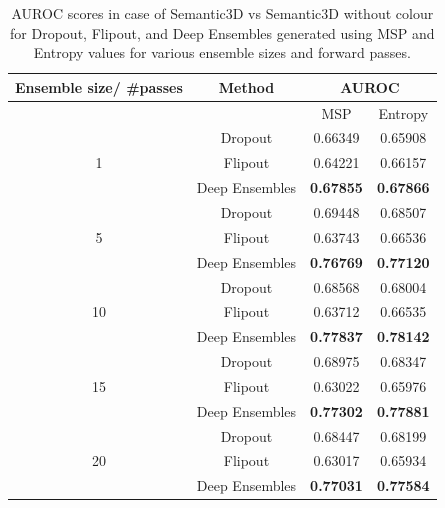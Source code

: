     \begin{table}[h!]
        \centering
        \begin{tabular}{cccc}
        \hline
        Ensemble size/ \#passes & Method               &  \multicolumn{2}{c}{AUROC}          \\ \hline
                                &                      &  MSP             & Entropy          \\ \hline
        \multirow{3}{*}{1}      & Dropout              & 0.66349          & 0.65908          \\
                                & Flipout              & 0.64221          & 0.66157          \\
                                & Deep Ensembles       & \textbf{0.67855} & \textbf{0.67866} \\ \hline
        \multirow{3}{*}{5}      & Dropout              & 0.69448          & 0.68507          \\
                                & Flipout              & 0.63743          & 0.66536          \\
                                & Deep Ensembles       & \textbf{0.76769} & \textbf{0.77120} \\ \hline
        \multirow{3}{*}{10}     & Dropout              & 0.68568          & 0.68004          \\
                                & Flipout              & 0.63712          & 0.66535          \\
                                & Deep Ensembles       & \textbf{0.77837} & \textbf{0.78142} \\ \hline
        \multirow{3}{*}{15}     & Dropout              & 0.68975          & 0.68347          \\
                                & Flipout              & 0.63022           & 0.65976          \\
                                & Deep Ensembles       & \textbf{0.77302} & \textbf{0.77881} \\ \hline
        \multirow{3}{*}{20}     & Dropout              & 0.68447          & 0.68199          \\
                                & Flipout              & 0.63017          & 0.65934          \\
                                & Deep Ensembles       & \textbf{0.77031} & \textbf{0.77584} \\ \hline
        \end{tabular}
        \caption{AUROC scores in case of Semantic3D vs Semantic3D without colour for Dropout, Flipout, and  Deep Ensembles generated using MSP and Entropy values for various ensemble sizes and forward passes.}
        \label{tab:auroc_ood_2}
    \end{table}
